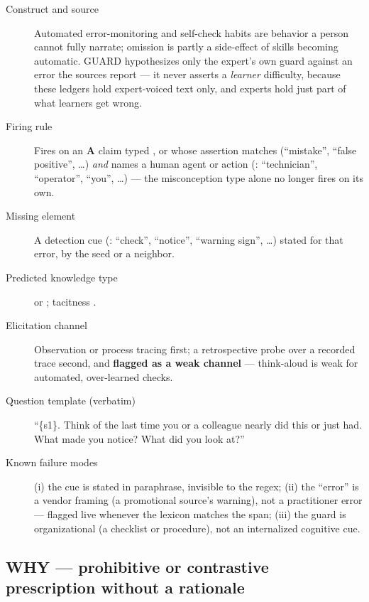 \begin{description}
  \item[Construct and source] Automated error-monitoring and self-check habits are behavior a
    person cannot fully narrate; omission is partly a side-effect of skills becoming automatic.
    GUARD hypothesizes only the expert's own guard against an error the sources report --- it never
    asserts a \emph{learner} difficulty, because these ledgers hold expert-voiced text only, and
    experts hold just part of what learners get wrong.
  \item[Firing rule] Fires on an \textbf{A} claim typed , or whose assertion
    matches  (\enquote{mistake}, \enquote{false positive}, \ldots) \emph{and} names a
    human agent or action (: \enquote{technician}, \enquote{operator},
    \enquote{you}, \ldots) --- the misconception type alone no longer fires on its own.
  \item[Missing element] A detection cue (: \enquote{check}, \enquote{notice},
    \enquote{warning sign}, \ldots) stated for that error, by the seed or a neighbor.
  \item[Predicted knowledge type]  or ; tacitness
    .
  \item[Elicitation channel] Observation or process tracing first; a retrospective probe over a
    recorded trace second, and \textbf{flagged as a weak channel} --- think-aloud is weak for
    automated, over-learned checks.
  \item[Question template (verbatim)] \enquote{\textquotedbl\{s1\}\textquotedbl. Think of the last
    time you or a colleague nearly did this or just had. What made you notice? What did you look
    at?}
  \item[Known failure modes] (i) the cue is stated in paraphrase, invisible to the 
    regex; (ii) the \enquote{error} is a vendor framing (a promotional source's warning), not a
    practitioner error --- flagged live whenever the  lexicon matches the span; (iii)
    the guard is organizational (a checklist or procedure), not an internalized cognitive cue.
\end{description}

\subsection{WHY --- prohibitive or contrastive prescription without a rationale}

